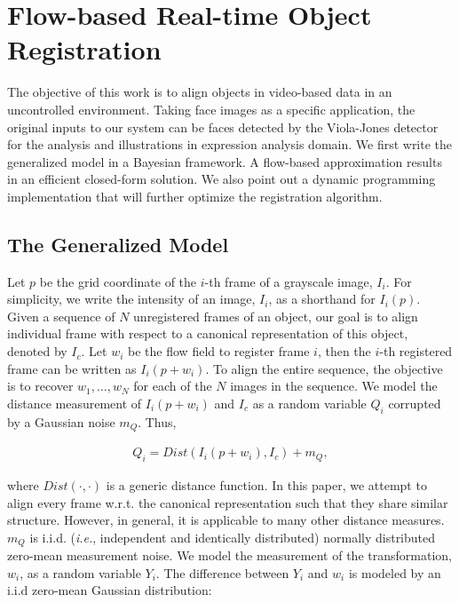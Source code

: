 \documentclass[10pt,journal]{IEEEtran}
\begin{document}
\section{\label{sec:approach}Flow-based Real-time Object Registration}

The objective of this work is to align objects in video-based data in an uncontrolled environment. Taking face images as a specific application, the original inputs to our system can be faces detected by the Viola-Jones detector~\cite{Viola_IJCV04} for the analysis and illustrations in expression analysis domain. We first write the generalized model in a Bayesian framework. A flow-based approximation results in an efficient closed-form solution. We also point out a dynamic programming implementation that will further optimize the registration algorithm.

\subsection{\label{sec:model}The Generalized Model}

Let $p$ be the grid coordinate of the $i$-th frame of a grayscale image, $I_i$. For simplicity, we write the intensity of an image, $I_i$, as a shorthand for $I_i(p)$. Given a sequence of $N$ unregistered frames of an object, our goal is to align individual frame with respect to a canonical representation of this object, denoted by $I_c$. Let $w_i$ be the flow field to register frame $i$, then the $i$-th registered frame can be written as $I_i(p+w_i)$. To align the entire sequence, the objective is to recover $w_1,\ldots,w_N$ for each of the $N$ images in the sequence.  We model the distance measurement of $I_i(p+w_i)$ and $I_c$ as a random variable $Q_i$ corrupted by a Gaussian noise $m_Q$. Thus,

\begin{align}
\label{model:measurement}
Q_i=Dist(I_i(p+w_i),I_c)+m_Q,
\end{align}

\noindent where $Dist(\cdot,\cdot)$ is a generic distance function. In this paper, we attempt to align every frame w.r.t. the canonical representation such that they share similar structure. However, in general, it is applicable to many other distance measures. $m_Q$ is i.i.d. (\textit{i.e.}, independent and identically distributed) normally distributed zero-mean measurement noise. We model the measurement of the transformation, $w_i$, as a random variable $Y_i$. The difference between $Y_i$ and $w_i$ is modeled by an i.i.d zero-mean Gaussian distribution:
\end{document}
